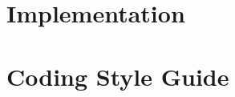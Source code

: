 \documentclass[12pt]{article}
\begin{document}

\section{Implementation}
\label{sec:implementation}
%         

\section{Coding Style Guide}
\end{document}
